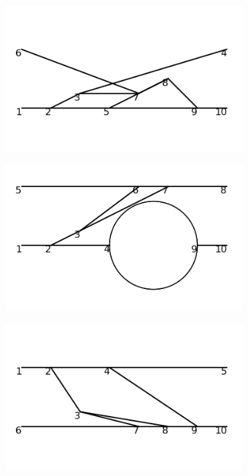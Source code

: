 \documentclass[11pt,a4paper,twoside,pdf]{article}
\numberwithin{equation}{section}
\begin{document}
\begin{figure}[h!]
\begin{subfigure}[t]{0.16\textwidth}
    \end{subfigure}
    \hfill 
    \begin{subfigure}[t]{0.16\textwidth}
        \centering
        \includegraphics[width=\textwidth]{plots/order6_2to2/9.png}
    \end{subfigure}
    \hfill
    \begin{subfigure}[t]{0.16\textwidth}
        \centering
        \includegraphics[width=\textwidth]{plots/order6_2to2/10.png}
    \end{subfigure}
    \hfill 
    \begin{subfigure}[t]{0.16\textwidth}
        \centering
        \includegraphics[width=\textwidth]{plots/order6_2to2/11.png}

\end{subfigure}
\end{figure}
\end{document}

